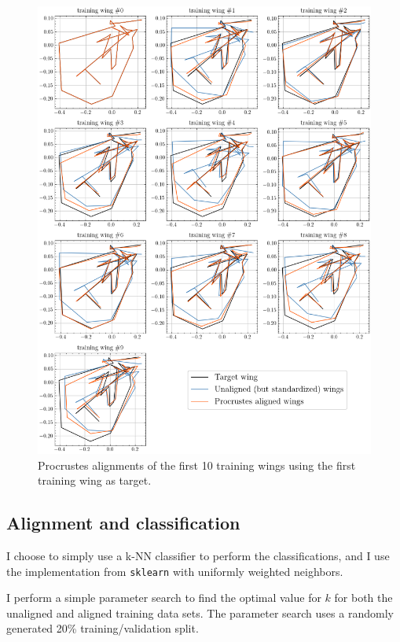 \begin{figure}[H]
  \centering
  \includegraphics[width=\textwidth]{figures/task_3_1.png}
  \caption{Procrustes alignments of the first 10 training wings using the first
  training wing as target.}
  \label{fig:task_3_1}
\end{figure}

\subsection{Alignment and classification}

I choose to simply use a k-NN classifier to perform the classifications, and I
use the implementation from \texttt{sklearn} with uniformly weighted neighbors.

I perform a simple parameter search to find the optimal value for $k$ for both
the unaligned and aligned training data sets. The parameter search uses a
randomly generated 20\% training/validation split.

